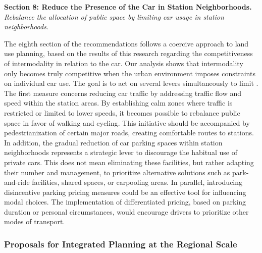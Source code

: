 \begin{refsegment}
    \begin{displayquote}
\textbf{Section 8: Reduce the Presence of the Car in Station Neighborhoods.}
\\
\textsl{Rebalance the allocation of public space by limiting car usage in station neighborhoods.}
    \end{displayquote}
The eighth section of the recommendations follows a coercive approach to land use planning, based on the results of this research regarding the competitiveness of intermodality in relation to the car. Our analysis shows that intermodality only becomes truly competitive when the urban environment imposes constraints on individual car use. The goal is to act on several levers simultaneously to limit . The first measure concerns reducing car traffic by addressing traffic flow and speed within the station areas. By establishing calm zones where traffic is restricted or limited to lower speeds, it becomes possible to rebalance public space in favor of walking and cycling. This initiative should be accompanied by pedestrianization of certain major roads, creating comfortable routes to stations. In addition, the gradual reduction of car parking spaces within station neighborhoods represents a strategic lever to discourage the habitual use of private cars. This does not mean eliminating these facilities, but rather adapting their number and management, to prioritize alternative solutions such as park-and-ride facilities, shared spaces, or carpooling areas. In parallel, introducing disincentive parking pricing measures could be an effective tool for influencing modal choices. The implementation of differentiated pricing, based on parking duration or personal circumstances, would encourage drivers to prioritize other modes of transport.%

\subsubsection*{Proposals for Integrated Planning at the Regional Scale
    \label{conclusion-generale:implications-planification}
    }


\end{refsegment}
